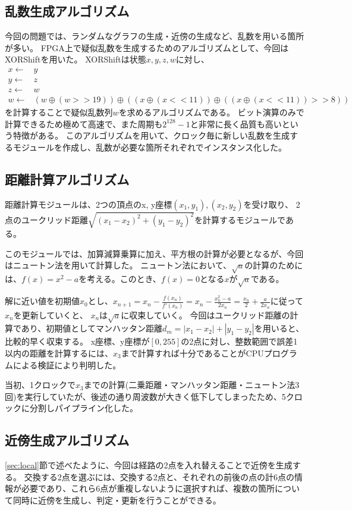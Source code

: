 \subsection*{乱数生成アルゴリズム}
今回の問題では、ランダムなグラフの生成・近傍の生成など、乱数を用いる箇所が多い。
FPGA上で疑似乱数を生成するためのアルゴリズムとして、今回はXORShiftを用いた。
XORShiftは状態$x, y, z, w$に対し、
\begin{align*}
    x \leftarrow& y \\
    y \leftarrow& z \\
    z \leftarrow& w \\
    w \leftarrow& (w\oplus(w>>19))\oplus((x\oplus(x<<11))\oplus((x\oplus(x<<11))>>8))
\end{align*}
を計算することで疑似乱数列${w}$を求めるアルゴリズムである。
ビット演算のみで計算できるため極めて高速で、また周期も$2^{128}-1$と非常に長く品質も高いという特徴がある。
このアルゴリズムを用いて、クロック毎に新しい乱数を生成するモジュールを作成し、乱数が必要な箇所それぞれでインスタンス化した。

\subsection*{距離計算アルゴリズム}\label{sec:distance}
距離計算モジュールは、2つの頂点のx, y座標$(x_1, y_1), (x_2, y_2)$を受け取り、
2点のユークリッド距離$\sqrt{(x_1-x_2)^2+(y_1-y_2)^2}$を計算するモジュールである。

このモジュールでは、加算減算乗算に加え、平方根の計算が必要となるが、今回はニュートン法を用いて計算した。
ニュートン法において、$\sqrt{a}$の計算のためには、$f(x)=x^2-a$を考える。このとき、$f(x)=0$となる$x$が$\sqrt{a}$である。

解に近い値を初期値$x_0$とし、$x_{n+1}=x_n-\frac{f(x_n)}{f'(x_n)}=x_n-\frac{x_n^2-a}{2x_n}=\frac{x_n}{2}+\frac{a}{2x_n}$に従って$x_n$を更新していくと、
$x_n$は$\sqrt{a}$に収束していく。
今回はユークリッド距離の計算であり、初期値としてマンハッタン距離$d_m=|x_1-x_2|+|y_1-y_2|$を用いると、比較的早く収束する。
x座標、y座標が$[0,255]$の2点に対し、整数範囲で誤差1以内の距離を計算するには、$x_3$まで計算すれば十分であることがCPUプログラムによる検証により判明した。

当初、1クロックで$x_3$までの計算(二乗距離・マンハッタン距離・ニュートン法3回)を実行していたが、後述の通り周波数が大きく低下してしまったため、5クロックに分割しパイプライン化した。

\subsection*{近傍生成アルゴリズム}
\ref{sec:local}節で述べたように、今回は経路の2点を入れ替えることで近傍を生成する。
交換する2点を選ぶには、交換する2点と、それぞれの前後の点の計6点の情報が必要であり、これら6点が重複しないように選択すれば、複数の箇所について同時に近傍を生成し、判定・更新を行うことができる。

